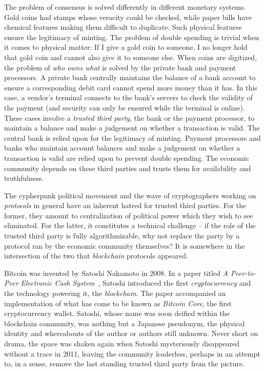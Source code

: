 The problem of consensus is solved differently in different monetary systems. Gold
coins had stamps whose veracity could be checked, while paper bills have chemical
features making them difficult to duplicate. Such physical features ensure the
legitimacy of minting. The problem of double spending is trivial when it comes to
physical matter: If I give a
gold coin to someone, I no longer hold that gold coin and cannot also give it to
someone else. When coins are digitized, the problem of \emph{who owns what}
is solved by the private bank and payment processors.
A private bank centrally maintains the balance of a bank account to ensure a
corresponding debit card cannot spend more money than it has. In this case, a
vendor's terminal connects to the bank's servers to check the validity of the
payment (and security can only be ensured while the terminal is online). These
cases involve a \emph{trusted third party}, the
bank or the payment processor, to maintain a balance and make a judgement on
whether a transaction is valid. The central bank is relied upon for the
legitimacy of minting. Payment processors and banks who maintain account
balances and make a judgement on whether a transaction is valid are relied upon
to prevent double spending. The economic community depends on these third
parties and trusts them for availability and truthfulness.

The cypherpunk political movement and the wave of
cryptographers working on \emph{protocols} in general have an inherent hatred
for trusted third parties. For the former, they amount to
centralization of political power which they wish to see eliminated. For the
latter, it constitutes a technical challenge -- if the role of the trusted
third party is fully algorithmizable, why not replace the party by a protocol
ran by the economic community themselves? It is somewhere in the intersection of the
two that \emph{blockchain} protocols appeared.

Bitcoin was invented by Satoshi Nakamoto
in 2008. In a paper titled
\emph{A Peer-to-Peer Electronic Cash System}~\cite{bitcoin}, Satoshi introduced
the first \emph{cryptocurrency} and the technology powering it, the
\emph{blockchain}. The paper accompanied an implementation of what has come to
be known as \emph{Bitcoin Core}, the first cryptocurrency
wallet. Satoshi, whose name was soon deified within
the blockchain community, was nothing but a Japanese pseudonym, the
physical identity and whereabouts of the author or authors still unknown. Never
short on drama, the space was shaken again when Satoshi mysteriously disappeared
without a trace in 2011, leaving the community leaderless, perhaps in an attempt
to, in a sense, remove the last standing trusted third party from the picture.

